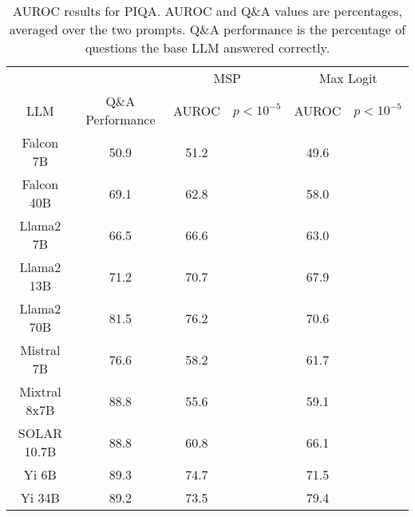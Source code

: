 \begin{table*}
\centering
\begin{tabular}{c|c|c|c|c|c}
& & \multicolumn{2}{c|}{MSP} & \multicolumn{2}{c}{Max Logit} \\ 
LLM & Q\&A Performance & AUROC & $p < 10^{-5}$ & AUROC & $p < 10^{-5}$\\ \hline
Falcon 7B & 50.9 & 51.2 &  & 49.6 & \\
Falcon 40B & 69.1 & 62.8 &  & 58.0 & \\
Llama2 7B & 66.5 & 66.6 &  & 63.0 & \\
Llama2 13B & 71.2 & 70.7 &  & 67.9 & \\
Llama2 70B & 81.5 & 76.2 &  & 70.6 & \\
Mistral 7B & 76.6 & 58.2 &  & 61.7 & \\
Mixtral 8x7B & 88.8 & 55.6 &  & 59.1 & \\
SOLAR 10.7B & 88.8 & 60.8 &  & 66.1 & \\
Yi 6B & 89.3 & 74.7 &  & 71.5 & \\
Yi 34B & 89.2 & 73.5 &  & 79.4 & \\
\hline
\end{tabular}
\caption{AUROC results for PIQA. AUROC and Q\&A values are percentages, averaged over the two prompts. Q\&A performance is the percentage of questions the base LLM answered correctly.}
\label{tab:piqa_auroc}
\end{table*}
